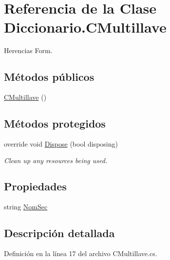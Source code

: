\hypertarget{class_diccionario_1_1_c_multillave}{\section{Referencia de la Clase Diccionario.\-C\-Multillave}
\label{class_diccionario_1_1_c_multillave}
}


Herencias Form.

\subsection*{Métodos públicos}
\begin{DoxyCompactItemize}
\item 
\hyperlink{class_diccionario_1_1_c_multillave_aef84a0bcdb297f4d89af796ad3b5e9c0}{C\-Multillave} ()
\end{DoxyCompactItemize}
\subsection*{Métodos protegidos}
\begin{DoxyCompactItemize}
\item 
override void \hyperlink{class_diccionario_1_1_c_multillave_ae9382e7c92150281dca4a7fefbcdde04}{Dispose} (bool disposing)
\begin{DoxyCompactList}\small\item\em Clean up any resources being used. \end{DoxyCompactList}\end{DoxyCompactItemize}
\subsection*{Propiedades}
\begin{DoxyCompactItemize}
\item 
string \hyperlink{class_diccionario_1_1_c_multillave_af79a9ae500eaaf6c7f591dc839a5b223}{Nom\-Sec}
\end{DoxyCompactItemize}


\subsection{Descripción detallada}


Definición en la línea 17 del archivo C\-Multillave.\-cs.



